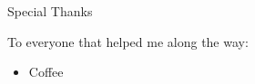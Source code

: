 \documentclass[../main.tex]{subfiles}
\begin{document}
    {\LARGE Special Thanks}
    
    To everyone that helped me along the way:
    \begin{itemize}
        \item Coffee
    \end{itemize}
\end{document}
